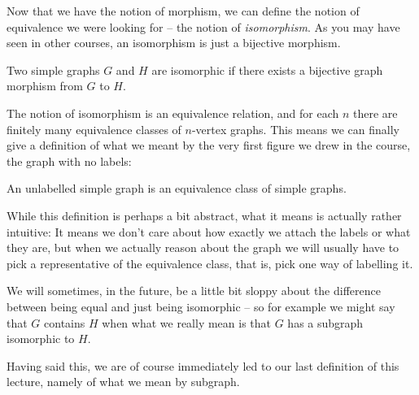 \documentclass[nobib]{tufte-handout}
\begin{document}
Now that we have the notion of morphism, we can define the notion of equivalence we were looking for -- the notion of \emph{isomorphism}. As you may have seen in other courses, an isomorphism is just a bijective morphism.

\begin{definition}
  Two simple graphs $G$ and $H$ are isomorphic if there exists a bijective graph morphism from $G$ to $H$.
\end{definition}

The notion of isomorphism is an equivalence relation, and for each $n$ there are finitely many equivalence classes of $n$-vertex graphs. This means we can finally give a definition of what we meant by the very first figure we drew in the course, the graph with no labels:

\begin{definition}
  An unlabelled simple graph is an equivalence class of simple graphs.
\end{definition}

While this definition is perhaps a bit abstract, what it means is actually rather intuitive: It means we don't care about how exactly we attach the labels or what they are, but when we actually reason about the graph we will usually have to pick a representative of the equivalence class, that is, pick one way of labelling it.

We will sometimes, in the future, be a little bit sloppy about the difference between being equal and just being isomorphic -- so for example we might say that $G$ contains $H$ when what we really mean is that $G$ has a subgraph isomorphic to $H$.

Having said this, we are of course immediately led to our last definition of this lecture, namely of what we mean by subgraph.
\end{document}

